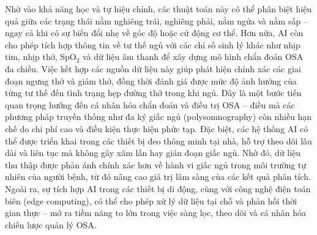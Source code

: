 Nhờ vào khả năng học và tự hiệu chỉnh, các thuật toán này có thể phân 
biệt hiệu quả giữa các trạng thái nằm nghiêng trái, nghiêng phải, nằm ngửa và nằm sấp – 
ngay cả khi có sự biến đổi nhẹ về góc độ hoặc cử động cơ thể. 
Hơn nữa, AI còn cho phép tích hợp thông tin về tư thế ngủ với các chỉ số sinh lý 
khác như nhịp tim, nhịp thở, SpO$_2$ và dữ liệu âm thanh để xây 
dựng mô hình chẩn đoán OSA đa chiều. Việc kết hợp các nguồn dữ liệu 
này giúp phát hiện chính xác các giai đoạn ngưng thở và giảm thở, 
đồng thời đánh giá được mức độ ảnh hưởng của từng tư thế đến tình trạng 
hẹp đường thở trong khi ngủ. Đây là một bước tiến quan trọng hướng đến 
cá nhân hóa chẩn đoán và điều trị OSA – điều mà các phương pháp truyền thống 
như đa ký giấc ngủ (polysomnography) còn nhiều hạn chế do chi phí cao và 
điều kiện thực hiện phức tạp. Đặc biệt, các hệ thống AI có thể được 
triển khai trong các thiết bị đeo thông minh tại nhà, hỗ trợ theo dõi 
lâu dài và liên tục mà không gây xâm lấn hay gián đoạn giấc ngủ. 
Nhờ đó, dữ liệu thu thập được phản ánh chính xác hơn về hành vi giấc 
ngủ trong môi trường tự nhiên của người bệnh, từ đó nâng cao giá trị 
lâm sàng của các kết quả phân tích. Ngoài ra, sự tích hợp AI trong các 
thiết bị di động, cùng với công nghệ điện toán biên (edge computing), 
có thể cho phép xử lý dữ liệu tại chỗ và phản hồi thời gian thực – 
mở ra tiềm năng to lớn trong việc sàng lọc, theo dõi và cá nhân hóa 
chiến lược quản lý OSA.

















% 


